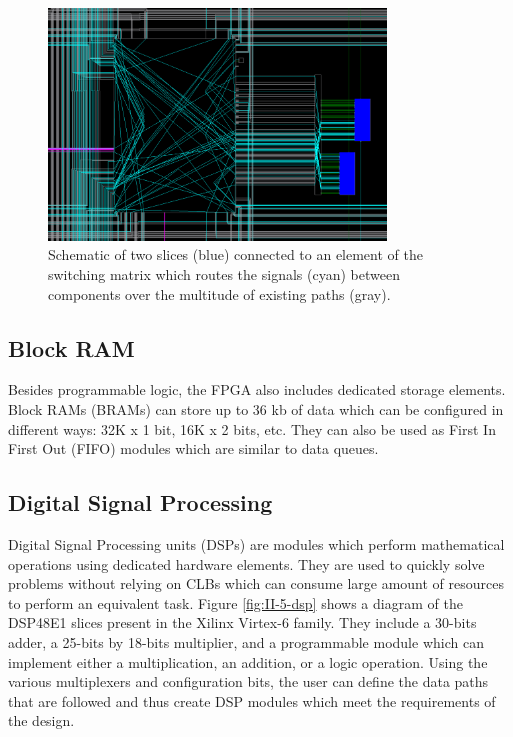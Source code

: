       \begin{figure}[h!]
        \centering
        \includegraphics[width=0.8\textwidth]{img/II-5-irradiation/switch.png}
        \caption{Schematic of two slices (blue) connected to an element of the switching matrix which routes the signals (cyan) between components over the multitude of existing paths (gray).}
        \label{fig:II-5-switch}
      \end{figure}

    \subsection{Block RAM}

      Besides programmable logic, the FPGA also includes dedicated storage elements. Block RAMs (BRAMs) \cite{VIRTEX-RAM} can store up to 36 kb of data which can be configured in different ways: 32K x 1 bit, 16K x 2 bits, etc. They can also be used as First In First Out (FIFO) modules which are similar to data queues.

    \subsection{Digital Signal Processing}

      Digital Signal Processing units (DSPs) \cite{VIRTEX-DSP} are modules which perform mathematical operations using dedicated hardware elements. They are used to quickly solve problems without relying on CLBs which can consume large amount of resources to perform an equivalent task. Figure \ref{fig:II-5-dsp} shows a diagram of the DSP48E1 slices present in the Xilinx Virtex-6 family. They include a 30-bits adder, a 25-bits by 18-bits multiplier, and a programmable module which can implement either a multiplication, an addition, or a logic operation. Using the various multiplexers and configuration bits, the user can define the data paths that are followed and thus create DSP modules which meet the requirements of the design.

